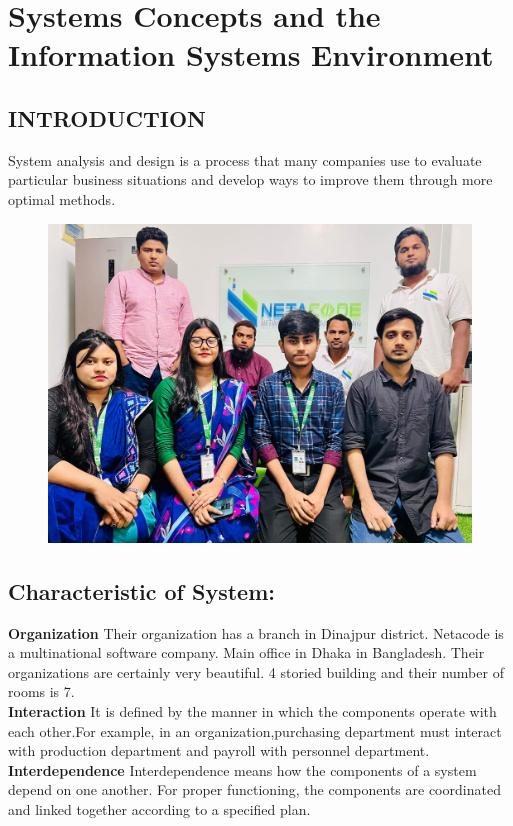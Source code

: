 \documentclass[a4paper,12pt]{report}
\begin{document}
\chapter{Systems Concepts and the Information Systems Environment}
\section{INTRODUCTION}
 System analysis and design is a process that many companies use to evaluate particular business situations and develop ways to improve them through more optimal methods.\\
\begin{figure}[h]
	\centering
	\includegraphics[width=0.7\linewidth]{IMG-20220920-WA0002}
	\label{fig:img-20220920-wa0002}
\end{figure}
\section {Characteristic of System:}
\textbf{Organization}
Their organization has a branch in Dinajpur district. Netacode is a multinational software company. Main office in Dhaka in Bangladesh. Their organizations are certainly very beautiful. 4 storied building and their number of rooms is 7.\\

\textbf{Interaction}
It is defined by the manner in which the components operate with each other.For example, in an organization,purchasing department must interact with production department and payroll with personnel department.\\

\textbf{Interdependence}
Interdependence means how the components of a system depend on one another. For proper functioning, the components are coordinated and linked together according to a specified plan. \\
\end{document}
